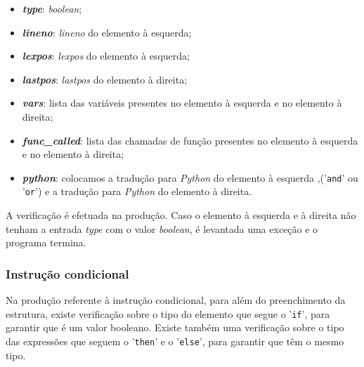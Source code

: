 \documentclass[11pt,a4paper]{report}
\begin{document}
\begin{itemize}
  \item \textit{\textbf{type}}: \textit{boolean};
  \item \textit{\textbf{lineno}}: \textit{lineno} do elemento à esquerda;
  \item \textit{\textbf{lexpos}}: \textit{lexpos} do elemento à esquerda;
  \item \textit{\textbf{lastpos}}: \textit{lastpos} do elemento à direita;
  \item \textit{\textbf{vars}}: lista das variáveis presentes no elemento à esquerda e no elemento à direita;
  \item \textit{\textbf{func\_called}}: lista das chamadas de função presentes no elemento à esquerda e no elemento à direita;
  \item \textit{\textbf{python}}: colocamos a tradução para \textit{Python} do elemento à esquerda ,('\texttt{and}' ou '\texttt{or}') e a tradução para \textit{Python} do elemento à direita.
\end{itemize}

A verificação é efetuada na produção. Caso o elemento à esquerda e à direita não tenham a entrada \textit{type} com o valor \textit{boolean}, é levantada uma exceção e o programa termina.

\subsubsection{Instrução condicional}

Na produção referente à instrução condicional, para além do preenchimento da estrutura, existe verificação sobre o tipo do elemento que segue o '\texttt{if}', para garantir que é um valor booleano. Existe também uma verificação sobre o tipo das expressões que seguem o '\texttt{then}' e o '\texttt{else}', para garantir que têm o mesmo tipo.
\end{document}
